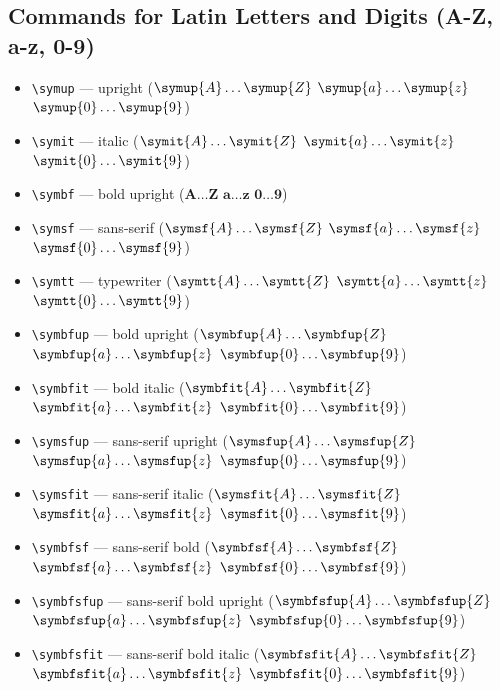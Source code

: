 \documentclass[12pt,a4paper]{article}
\begin{document}
\subsection*{Commands for Latin Letters and Digits (A-Z, a-z, 0-9)}

\begin{itemize}
    \item \texttt{\textbackslash{}symup} --- upright ($\symup{A} \ldots \symup{Z}$ $\symup{a} \ldots \symup{z}$ $\symup{0} \ldots \symup{9}$)
    \item \texttt{\textbackslash{}symit} --- italic ($\symit{A} \ldots \symit{Z}$ $\symit{a} \ldots \symit{z}$ $\symit{0} \ldots \symit{9}$)
    \item \texttt{\textbackslash{}symbf} --- bold upright ($\symbf{A} \ldots \symbf{Z}$ $\symbf{a} \ldots \symbf{z}$ $\symbf{0} \ldots \symbf{9}$)
    \item \texttt{\textbackslash{}symsf} --- sans-serif ($\symsf{A} \ldots \symsf{Z}$ $\symsf{a} \ldots \symsf{z}$ $\symsf{0} \ldots \symsf{9}$)
    \item \texttt{\textbackslash{}symtt} --- typewriter ($\symtt{A} \ldots \symtt{Z}$ $\symtt{a} \ldots \symtt{z}$ $\symtt{0} \ldots \symtt{9}$)
    \item \texttt{\textbackslash{}symbfup} --- bold upright ($\symbfup{A} \ldots \symbfup{Z}$ $\symbfup{a} \ldots \symbfup{z}$ $\symbfup{0} \ldots \symbfup{9}$)
    \item \texttt{\textbackslash{}symbfit} --- bold italic ($\symbfit{A} \ldots \symbfit{Z}$ $\symbfit{a} \ldots \symbfit{z}$ $\symbfit{0} \ldots \symbfit{9}$)
    \item \texttt{\textbackslash{}symsfup} --- sans-serif upright ($\symsfup{A} \ldots \symsfup{Z}$ $\symsfup{a} \ldots \symsfup{z}$ $\symsfup{0} \ldots \symsfup{9}$)
    \item \texttt{\textbackslash{}symsfit} --- sans-serif italic ($\symsfit{A} \ldots \symsfit{Z}$ $\symsfit{a} \ldots \symsfit{z}$ $\symsfit{0} \ldots \symsfit{9}$)
    \item \texttt{\textbackslash{}symbfsf} --- sans-serif bold ($\symbfsf{A} \ldots \symbfsf{Z}$ $\symbfsf{a} \ldots \symbfsf{z}$ $\symbfsf{0} \ldots \symbfsf{9}$)
    \item \texttt{\textbackslash{}symbfsfup} --- sans-serif bold upright ($\symbfsfup{A} \ldots \symbfsfup{Z}$ $\symbfsfup{a} \ldots \symbfsfup{z}$ $\symbfsfup{0} \ldots \symbfsfup{9}$)
    \item \texttt{\textbackslash{}symbfsfit} --- sans-serif bold italic ($\symbfsfit{A} \ldots \symbfsfit{Z}$ $\symbfsfit{a} \ldots \symbfsfit{z}$ $\symbfsfit{0} \ldots \symbfsfit{9}$)

\end{itemize}
\end{document}
